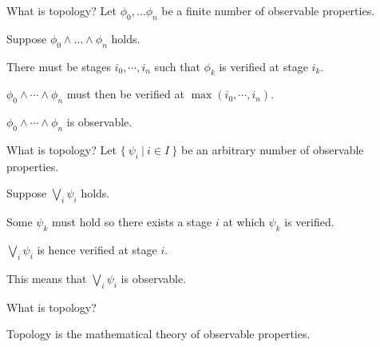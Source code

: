 \documentclass[xcolor={dvipsnames}]{beamer}
\begin{document}
\begin{frame}{What is topology?}
  Let $\phi_0, \ldots \phi_n$ be a \alert{finite} number of observable properties.

  \vspace{1em}

  Suppose $\phi_0 \wedge \ldots \wedge \phi_n$ holds.

  \vspace{1em}

  There must be \alert{stages} $i_0, \cdots, i_n$ such that $\phi_k$ is verified at stage $i_k$.

  \vspace{1em}

  $\phi_0 \wedge \cdots \wedge \phi_n$ must then be verified at $\max(i_0, \cdots, i_n)$.

  \vspace{1em}

  $\phi_0 \wedge \cdots \wedge \phi_n$ is \alert{observable}.
\end{frame}

\begin{frame}{What is topology?}
    Let $\{~\psi_i ~|~ i \in I~\}$ be an \alert{arbitrary} number of observable properties.

    \vspace{1em}

    Suppose $\bigvee_i \psi_i$ holds.

    \vspace{1em}

    Some $\psi_k$ must hold so there exists a stage $i$ at which $\psi_k$ is verified.

    \vspace{1em}

    $\bigvee_i \psi_i$ is hence verified at stage $i$.

    \vspace{1em}

    This means that $\bigvee_i \psi_i$ is \alert{observable}.
\end{frame}

\begin{frame}{What is topology?}
  \Huge
  \begin{center}
    Topology is the mathematical theory of \alert{observable} properties.
  \end{center}
\end{frame}
\end{document}
